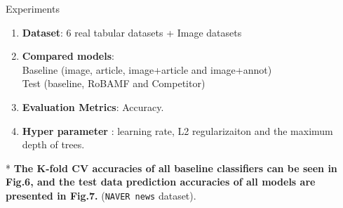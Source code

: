 \documentclass[final]{beamer}
\newlength{\colwidth}
\newcommand{\ben}{\begin{enumerate}}
\newcommand{\een}{\end{enumerate}}
\begin{document}
\begin{frame}[t]
\begin{columns}[t]
\begin{column}{\colwidth}
\begin{block}{Experiments}
    \ben
        \item \textbf{Dataset}: 6 real tabular datasets + Image datasets
        \item \textbf{Compared models}: \\
        Baseline (image, article, image+article and image+annot) \\
        Test (baseline, RoBAMF and Competitor)
        \item \textbf{Evaluation Metrics}: Accuracy.
        \item \textbf{Hyper parameter} : learning rate, L2 regularizaiton  and the maximum depth of trees.
    \een




    * \textbf{The K-fold CV accuracies of all baseline classifiers can be seen in Fig.6, and the test data prediction accuracies of all models are presented in Fig.7.} (\texttt{NAVER news} dataset).

    \vspace{5mm}
    

\end{block}
\end{column}
\end{columns}
\end{frame}
\end{document}
